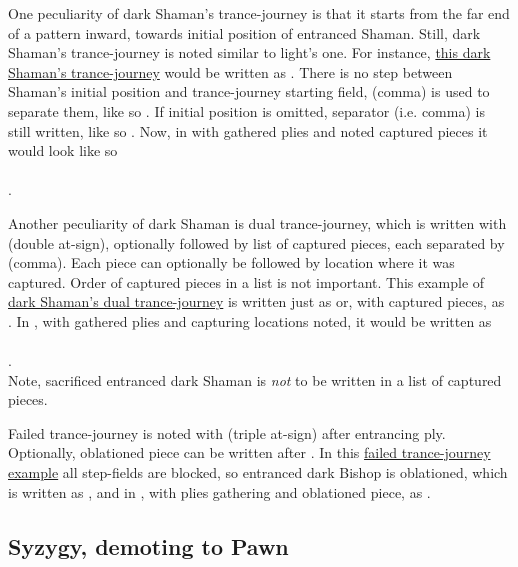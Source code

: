 One peculiarity of dark Shaman's trance-journey is that it starts from the far end of a
pattern inward, towards initial position of entranced Shaman. Still, dark Shaman's
trance-journey is noted similar to light's one. For instance,
\hyperref[fig:scn_cot_22_dark_dark_shaman_interaction_start]{this dark Shaman's trance-journey}
would be written as .
There is no step between Shaman's initial position and trance-journey starting field,
\alg{,} (comma) is used to separate them, like so .
If initial position is omitted, separator (i.e. comma) is still written, like so
. Now, in  with gathered plies and noted
captured pieces it would look like so\\
\\
\alg{[He12,w18..q16*P..k14*N..c18]}.

Another peculiarity of dark Shaman is dual trance-journey, which is written with 
(double at-sign), optionally followed by list of captured pieces, each separated by \alg{,}
(comma). Each piece can optionally be followed by location where it was captured. Order of
captured pieces in a list is not important. This example of
\hyperref[fig:scn_cot_24_dark_dark_shaman_double_interaction_start]{dark Shaman's dual trance-journey}
is written just as  or, with captured pieces, as
. In , with gathered plies and capturing
locations noted, it would be written as \\
\\
.\\
Note, sacrificed entranced dark Shaman is \emph{not} to be written in a list of captured
pieces.

Failed trance-journey is noted with  (triple at-sign) after entrancing ply.
Optionally, oblationed piece can be written after . In this
\hyperref[fig:scn_o_30_trance_journey_failed_2]{failed trance-journey example} all
step-fields are blocked, so entranced dark Bishop is oblationed, which is written as
, and in , with plies gathering and
oblationed piece, as .

\subsection*{Syzygy, demoting to Pawn}
\label{sec:Appendix/Notation/Syzygy, demoting to Pawn}

